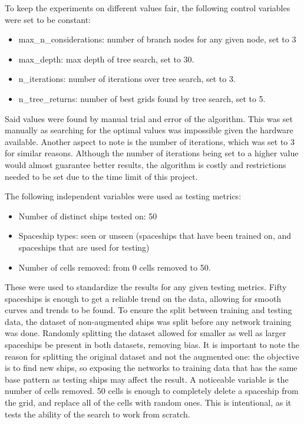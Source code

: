 \documentclass{l4proj}
\begin{document}
To keep the experiments on different values fair, the following control variables were set to be constant:
\begin{itemize}
    \item max\_n\_considerations: number of branch nodes for any given node, set to 3
    \item max\_depth: max depth of tree search, set to 30.
    \item n\_iterations: number of iterations over tree search, set to 3.
    \item n\_tree\_returns: number of best grids found by tree search, set to 5.
\end{itemize}

Said values were found by manual trial and error of the algorithm. This was set manually as searching for the optimal values was impossible given the hardware available. Another aspect to note is the number of iterations, which was set to 3 for similar reasons. Although the number of iterations being set to a higher value would almost guarantee better results, the algorithm is costly and restrictions needed to be set due to the time limit of this project.

The following independent variables were used as testing metrics:
\begin{itemize}
    \item Number of distinct ships tested on: 50
    \item Spaceship types: seen or unseen (spaceships that have been trained on, and spaceships that are used for testing)
    \item Number of cells removed: from 0 cells removed to 50.
\end{itemize}

These were used to standardize the results for any given testing metrics. Fifty spaceships is enough to get a reliable trend on the data, allowing for smooth curves and trends to be found. To ensure the split between training and testing data, the dataset of non-augmented ships was split before any network training was done. Randomly splitting the dataset allowed for smaller as well as larger spaceships be present in both datasets, removing bias. It is important to note the reason for splitting the original dataset and not the augmented one: the objective is to find new ships, so exposing the networks to training data that has the same base pattern as testing ships may affect the result. A noticeable variable is the number of cells removed. 50 cells is enough to completely delete a spaceship from the grid, and replace all of the cells with random ones. This is intentional, as it tests the ability of the search to work from scratch.
\end{document}

